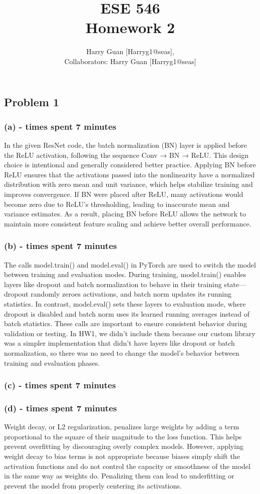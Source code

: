 \documentclass[11pt, reqno, letterpaper, twoside]{amsart}
\title{ESE 546\\[0.1in]
Homework 2}
\author{
Harry Guan [Harryg1@seas],\\
Collaborators: Harry Guan [Harryg1@seas]
}
\theoremstyle{plain}
\theoremstyle{definition}
\begin{document}
\maketitle

\subsection*{Problem 1}

\subsubsection*{(a) - times spent 7 minutes} In the given ResNet code, the batch normalization (BN) layer is applied before the ReLU activation, following the sequence Conv → BN → ReLU. This design choice is intentional and generally considered better practice. Applying BN before ReLU ensures that the activations passed into the nonlinearity have a normalized distribution with zero mean and unit variance, which helps stabilize training and improves convergence. If BN were placed after ReLU, many activations would become zero due to ReLU’s thresholding, leading to inaccurate mean and variance estimates. As a result, placing BN before ReLU allows the network to maintain more consistent feature scaling and achieve better overall performance.
\subsubsection*{(b) - times spent 7 minutes} The calls model.train() and model.eval() in PyTorch are used to switch the model between training and evaluation modes. During training, model.train() enables layers like dropout and batch normalization to behave in their training state—dropout randomly zeroes activations, and batch norm updates its running statistics. In contrast, model.eval() sets these layers to evaluation mode, where dropout is disabled and batch norm uses its learned running averages instead of batch statistics. These calls are important to ensure consistent behavior during validation or testing. In HW1, we didn’t include them because our custom library was a simpler implementation that didn’t have layers like dropout or batch normalization, so there was no need to change the model’s behavior between training and evaluation phases.
\subsubsection*{(c) - times spent 7 minutes}
\subsubsection*{(d) - times spent 7 minutes}
Weight decay, or L2 regularization, penalizes large weights by adding a term proportional to the square of their magnitude to the loss function. This helps prevent overfitting by discouraging overly complex models. However, applying weight decay to bias terms is not appropriate because biases simply shift the activation functions and do not control the capacity or smoothness of the model in the same way as weights do. Penalizing them can lead to underfitting or prevent the model from properly centering its activations.
\end{document}
